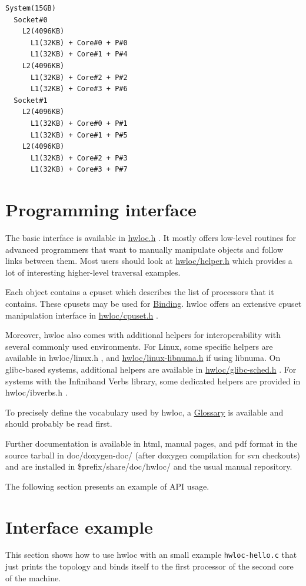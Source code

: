 \begin{Code}\begin{verbatim}System(15GB)
  Socket#0
    L2(4096KB)
      L1(32KB) + Core#0 + P#0
      L1(32KB) + Core#1 + P#4
    L2(4096KB)
      L1(32KB) + Core#2 + P#2
      L1(32KB) + Core#3 + P#6
  Socket#1
    L2(4096KB)
      L1(32KB) + Core#0 + P#1
      L1(32KB) + Core#1 + P#5
    L2(4096KB)
      L1(32KB) + Core#2 + P#3
      L1(32KB) + Core#3 + P#7
\end{verbatim}
\end{Code}



\hypertarget{index_interface}{}\section{Programming interface}\label{index_interface}
The basic interface is available in \hyperlink{hwloc_8h_source}{hwloc.h} . It mostly offers low-level routines for advanced programmers that want to manually manipulate objects and follow links between them. Most users should look at \hyperlink{helper_8h_source}{hwloc/helper.h} which provides a lot of interesting higher-level traversal examples.

Each object contains a cpuset which describes the list of processors that it contains. These cpusets may be used for \hyperlink{group__hwlocality__binding}{Binding}. hwloc offers an extensive cpuset manipulation interface in \hyperlink{cpuset_8h_source}{hwloc/cpuset.h} .

Moreover, hwloc also comes with additional helpers for interoperability with several commonly used environments. For Linux, some specific helpers are available in hwloc/linux.h , and \hyperlink{linux-libnuma_8h_source}{hwloc/linux-libnuma.h} if using libnuma. On glibc-based systems, additional helpers are available in \hyperlink{glibc-sched_8h_source}{hwloc/glibc-sched.h} . For systems with the Infiniband Verbs library, some dedicated helpers are provided in hwloc/ibverbs.h .

To precisely define the vocabulary used by hwloc, a \hyperlink{glossary}{Glossary} is available and should probably be read first.

Further documentation is available in html, manual pages, and pdf format in the source tarball in doc/doxygen-doc/ (after doxygen compilation for svn checkouts) and are installed in \$prefix/share/doc/hwloc/ and the usual manual repository.

The following section presents an example of API usage.\hypertarget{index_interface_example}{}\section{Interface example}\label{index_interface_example}
This section shows how to use hwloc with an small example {\tt hwloc-hello.c} that just prints the topology and binds itself to the first processor of the second core of the machine.

